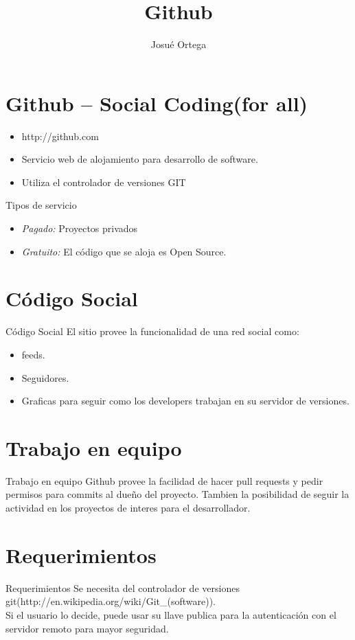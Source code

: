 \documentclass{beamer}
\title{Github}
\author{Josu\'e Ortega }
\institute{Seminario de Sistemas 1}
\begin{document}
\begin{frame}
\titlepage
\end{frame}
\section{Github -- Social Coding(for all)}
\begin{frame}
\begin{itemize}
\item http://github.com
\item Servicio web de alojamiento para desarrollo de software.
\item Utiliza el controlador de versiones GIT
\end{itemize}
\end{frame}
\begin{frame}{Tipos de servicio}
\begin{itemize}
\item {\em Pagado:} Proyectos privados 
\item {\em Gratuito:} El c\'odigo que se aloja es Open Source.
\end{itemize}
\end{frame}

\section {C\'odigo Social}
\begin{frame}{C\'odigo Social}
El sitio provee la funcionalidad de una red social como:
\begin{itemize}
\item feeds.
\item Seguidores.
\item Graficas para seguir como los developers trabajan en su servidor de 
  versiones.
\end{itemize}
\end{frame}
\section{Trabajo en equipo}
\begin{frame}{Trabajo en equipo}
Github provee la facilidad de hacer pull requests y pedir permisos para
commits al dueño del proyecto. Tambien la posibilidad de seguir la actividad
en los proyectos de interes para el desarrollador.
\end{frame}
\section{Requerimientos}
\begin{frame}{Requerimientos}
Se necesita del controlador de versiones git(http://en.wikipedia.org/wiki/Git\_(software)).
\\
Si el usuario lo decide, puede usar su llave publica para la autenticaci\'on con 
el servidor remoto para mayor seguridad. 
\end{frame}
\end{document}
